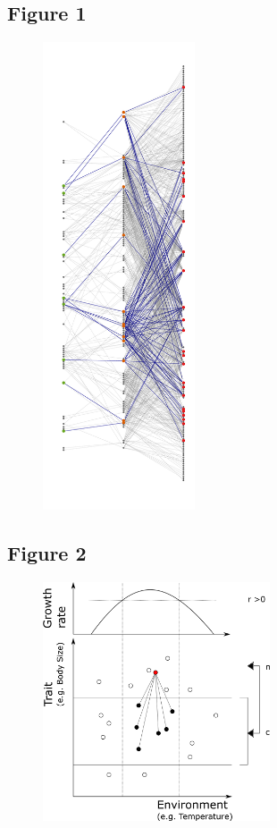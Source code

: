 \documentclass[12pt]{article}
\begin{document}
\subsection*{Figure 1}

\begin{figure}[ht!]
\centering\includegraphics[width=0.4\textwidth]{figures/mw_sampling}
\end{figure}

\newpage

\subsection*{Figure 2}

\begin{figure}[ht!]
\centering\includegraphics[width=0.6\textwidth]{figures/integrated_niche}
\end{figure}
\end{document}

